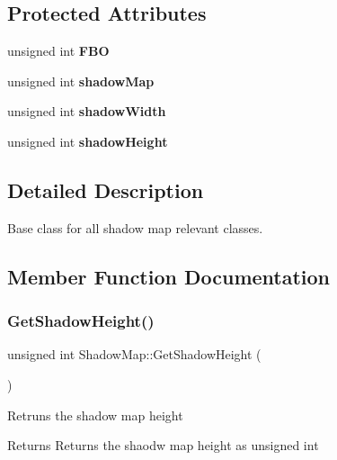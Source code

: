 \subsection*{Protected Attributes}
\begin{DoxyCompactItemize}
\item 
\mbox{\label{class_shadow_map_a63f35f3c81e69254227f0f0d308fb292}} 
unsigned int {\bfseries F\+BO}
\item 
\mbox{\label{class_shadow_map_a6121a7f092a476617a77ec0bb3b0caad}} 
unsigned int {\bfseries shadow\+Map}
\item 
\mbox{\label{class_shadow_map_aec402b8568a5895cf498631d2fd6e664}} 
unsigned int {\bfseries shadow\+Width}
\item 
\mbox{\label{class_shadow_map_a01efaf4e7515de89452dc7307d4ae194}} 
unsigned int {\bfseries shadow\+Height}
\end{DoxyCompactItemize}


\subsection{Detailed Description}
Base class for all shadow map relevant classes. 

\subsection{Member Function Documentation}
\mbox{\label{class_shadow_map_a04cb4ac6a4075d859e96ee3d55980a01}} 
\subsubsection{\texorpdfstring{GetShadowHeight()}{GetShadowHeight()}}
{\footnotesize\ttfamily unsigned int Shadow\+Map\+::\+Get\+Shadow\+Height (\begin{DoxyParamCaption}{ }\end{DoxyParamCaption})\hspace{0.3cm}{\ttfamily [inline]}}

Retruns the shadow map height \begin{DoxyReturn}{Returns}
Returns the shaodw map height as unsigned int 
\end{DoxyReturn}
\mbox{\label{class_shadow_map_aebc34fd1ba0da1b4672d1dd0036771c2}} 
